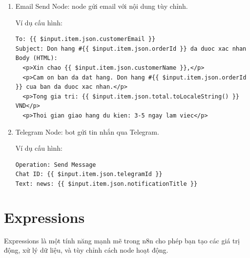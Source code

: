 \begin{enumerate}
\begin{lstlisting}[language = Javascript]
  // Lam sach du lieu
  if (itemLamSach.json.email) {
    itemLamSach.json.email = itemLamSach.json.email.toLowerCase().trim();
  }
  
  if (itemLamSach.json.phone) {
    // Loai bo cac ky tu khong phai so
    itemLamSach.json.phone = itemLamSach.json.phone.replace(/\D/g, '');
  }
  
  if (itemLamSach.json.name) {
    // Chuan hoa chu cai dau tien viet hoa
    itemLamSach.json.name = itemLamSach.json.name
      .trim()
      .split(' ')
      .map(word => word.charAt(0).toUpperCase() + word.slice(1).toLowerCase())
      .join(' ');
  }
  
  itemsDaLamSach.push(itemLamSach);
}

return itemsDaLamSach;
\end{lstlisting}

Với node này bạn chỉ cần tư duy để xử lý các logic đơn giản với code. 

\item Email Send Node: node gửi email với nội dung tùy chỉnh.

Ví dụ cấu hình:
\begin{verbatim}
To: {{ $input.item.json.customerEmail }}
Subject: Don hang #{{ $input.item.json.orderId }} da duoc xac nhan
Body (HTML):
  <p>Xin chao {{ $input.item.json.customerName }},</p>
  <p>Cam on ban da dat hang. Don hang #{{ $input.item.json.orderId }} cua ban da duoc xac nhan.</p>
  <p>Tong gia tri: {{ $input.item.json.total.toLocaleString() }} VND</p>
  <p>Thoi gian giao hang du kien: 3-5 ngay lam viec</p>
\end{verbatim}

\item Telegram Node: bot gửi tin nhắn qua Telegram.

Ví dụ cấu hình:

\begin{verbatim}
Operation: Send Message
Chat ID: {{ $input.item.json.telegramId }}
Text: news: {{ $input.item.json.notificationTitle }}
\end{verbatim}

\end{enumerate}




\section{Expressions}
Expressions là một tính năng mạnh mẽ trong n8n cho phép bạn tạo các giá trị động, xử lý dữ liệu, và tùy chỉnh cách node hoạt động.
